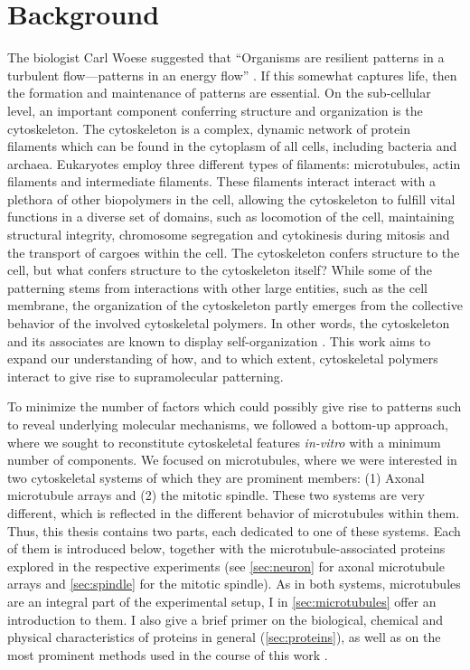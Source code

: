 \chapter{Background}
The biologist Carl Woese suggested that “Organisms are resilient patterns in a turbulent flow—patterns in an energy flow” \parencite{Woese}. If this somewhat captures life, then the formation and maintenance of patterns are essential. On the sub-cellular level, an important component conferring structure and organization is the cytoskeleton. The cytoskeleton is a complex, dynamic network of protein filaments which can be found in the cytoplasm of all cells, including bacteria and archaea. Eukaryotes employ three different types of filaments: microtubules, actin filaments and intermediate filaments. These filaments interact interact with a plethora of other biopolymers in the cell, allowing the cytoskeleton to fulfill vital functions in a diverse set of domains, such as locomotion of the cell, maintaining structural integrity, chromosome segregation and cytokinesis during mitosis and the transport of cargoes within the cell. The cytoskeleton confers structure to the cell, but what confers structure to the cytoskeleton itself? While some of the patterning stems from interactions with other large entities, such as the cell membrane, the organization of the cytoskeleton partly emerges from the collective behavior of the involved cytoskeletal polymers. In other words, the cytoskeleton and its associates are known to display self-organization \parencite{Karsenti2008}. This work aims to expand our understanding of how, and to which extent, cytoskeletal polymers interact to give rise to supramolecular patterning. \par
To minimize the number of factors which could possibly give rise to patterns such to reveal underlying molecular mechanisms, we followed a bottom-up approach, where we sought to reconstitute cytoskeletal features \textit{in-vitro} with a minimum number of components. We focused on microtubules, where we were interested in two cytoskeletal systems of which they are prominent members: (1) Axonal microtubule arrays and (2) the mitotic spindle. These two systems are very different, which is reflected in the different behavior of microtubules within them. Thus, this thesis contains two parts, each dedicated to one of these systems. Each of them is introduced below, together with the microtubule-associated proteins explored in the respective experiments (see \autoref{sec:neuron} for axonal microtubule arrays and \autoref{sec:spindle} for the mitotic spindle). As in both systems, microtubules are an integral part of the experimental setup, I in \autoref{sec:microtubules} offer an introduction to them. I also give a brief primer on the biological, chemical and physical characteristics of proteins in general (\autoref{sec:proteins}), as well as on the most prominent methods used in the course of this work .

